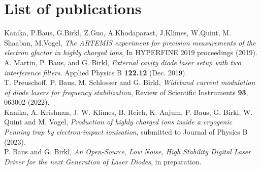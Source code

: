 \documentclass[12pt]{book}
\begin{document}
\chapter*{List of publications}

Kanika, P.Baus, G.Birkl, Z.Guo, A.Khodaparast, J.Klimes, W.Quint, M. Shaaban, M.Vogel, \textit{The ARTEMIS experiment for precision measurements of the electron gfactor in highly charged ions}, In HYPERFINE 2019 proceedings (2019).\\

A. Martin, P. Baus, and G. Birkl, \textit{External cavity diode laser setup
with two interference filters}. Applied Physics B \textbf{122.12} (Dec. 2019).\\

T. Preuschoff, P. Baus, M. Schlosser and G. Birkl, \textit{Wideband current modulation of diode lasers for frequency stabilization}, Review of Scientific Instruments \textbf{93}, 063002 (2022).\\

Kanika, A. Krishnan, J. W. Klimes, B. Reich, K. Anjum, P. Baus, G. Birkl, W. Quint and M. Vogel, \textit{Production of highly charged ions inside a cryogenic
Penning trap by electron-impact ionisation}, submitted to Journal of Physics B (2023).\\

P. Baus and G. Birkl, \textit{An Open-Source, Low Noise, High Stability Digital Laser Driver for the next
Generation of Laser Diodes}, in preparation.
\end{document}

